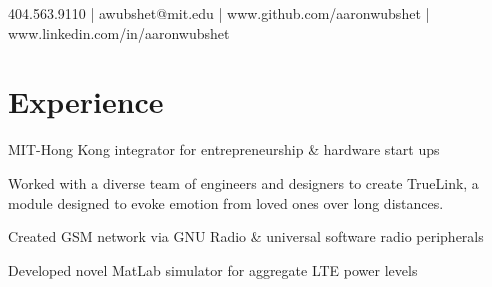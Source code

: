 \documentclass[letterpaper, article]{deedy-resume-openfont}
\begin{document}
%
%


{ 404.563.9110 | awubshet@mit.edu | www.github.com/aaronwubshet | www.linkedin.com/in/aaronwubshet}

%
%
\hfill

\begin{minipage}[t]{0.66\textwidth}
\vspace{.01cm}
\section{Experience}


\vspace{\topsep} %
\begin{tightemize}
	\item MIT-Hong Kong integrator for entrepreneurship \& hardware start ups
	\item Worked with a diverse team of engineers and designers to create TrueLink, a module designed to evoke emotion from loved ones over long distances.
\end{tightemize}
\sectionsep

\begin{tightemize}
	\item Created GSM network via GNU Radio \& universal software radio peripherals
	\item Developed novel MatLab simulator for aggregate LTE power levels
\end{tightemize}
\sectionsep


\end{minipage}
\end{document}
